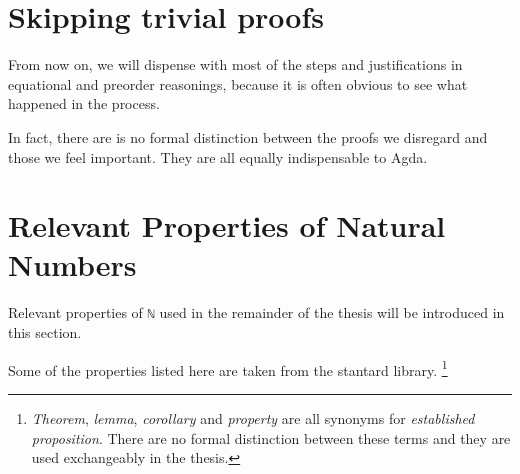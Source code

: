 \documentclass[../thesis.tex]{subfiles}
\begin{document}


%
%

\section{Skipping trivial proofs}

From now on, we will dispense with most of the steps and justifications in
equational and preorder reasonings,
because it is often obvious to see what happened in the process.

In fact, there are is no formal distinction between the proofs we disregard and
those we feel important. They are all equally indispensable to Agda.

\section{Relevant Properties of Natural Numbers}

Relevant properties of {\lstinline|ℕ|} used in the remainder of the thesis
will be introduced in this section.

Some of the properties listed here are taken from the stantard library.
\footnote{\textit{Theorem}, \textit{lemma}, \textit{corollary} and \textit{property}
are all synonyms for \textit{established proposition}. There are no formal
distinction between these terms and they are used exchangeably in the thesis.}


\end{document}
